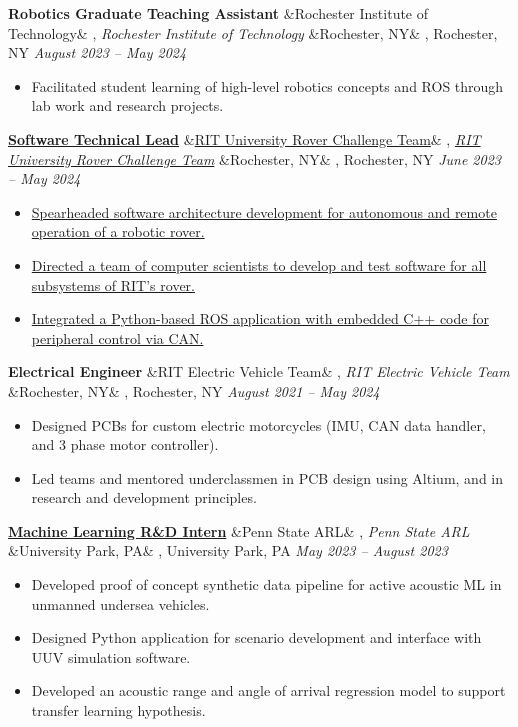 \documentclass[letterpaper,10pt]{article}
\newcommand{\experience}[5]{%
    \vspace{-1mm}%
    \noindent\textbf{#1}%
    \ifx&#2&
    \else
        , \textit{#2}%
    \fi
    \ifx&#3&
    \else
        , #3%
    \fi
    \hfill \textit{#4} \\
    \vspace{-6.8mm}%
    \begin{itemize}[itemsep=-5pt]
        \setlength{\itemindent}{0em}
        #5
    \end{itemize}
}
\begin{document}
\experience
    {Robotics Graduate Teaching Assistant}
    {Rochester Institute of Technology}
    {Rochester, NY}
    {August 2023 – May 2024}
    {
        \item  Facilitated student learning of high-level robotics concepts and ROS through lab work and research projects.
    }

\experience
    {\href{https://github.com/ryan-barry-99/rovers}{Software Technical Lead}}
    {\href{https://github.com/ryan-barry-99/rovers}{RIT University Rover Challenge Team}}
    {Rochester, NY}
    {June 2023 – May 2024}
    {
        \item \href{https://github.com/ryan-barry-99/rovers}{Spearheaded software architecture development for autonomous and remote operation of a robotic rover.}

        \item \href{https://github.com/ryan-barry-99/rovers}{Directed a team of computer scientists to develop and test software for all subsystems of RIT’s rover.}

        \item \href{https://github.com/ryan-barry-99/rovers}{Integrated a Python-based ROS application with embedded C++ code for peripheral control via CAN.}
    }

\experience
    {Electrical Engineer}
    {RIT Electric Vehicle Team}
    {Rochester, NY}
    {August 2021 – May 2024}
    {
        \item Designed PCBs for custom electric motorcycles (IMU, CAN data handler, and 3 phase motor controller).

        \item Led teams and mentored underclassmen in PCB design using Altium, and in research and development principles.

    }

\experience
    {\href{https://ryanbarry.me/projects/ai-ml/sonar-data-pipeline/}{Machine Learning R\&D Intern}}
    {Penn State ARL}
    {University Park, PA}
    {May 2023 – August 2023}
    {
        \item Developed proof of concept synthetic data pipeline for active acoustic ML in unmanned undersea vehicles.

        \item Designed Python application for scenario development and interface with UUV simulation software.

        \item Developed an acoustic range and angle of arrival regression model to support transfer learning hypothesis.
    }
\end{document}
